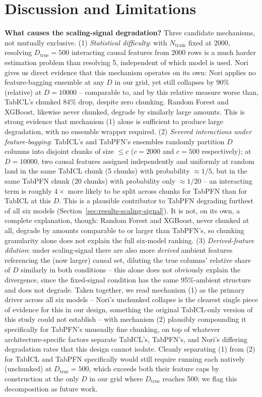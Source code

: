 \documentclass{article}
\begin{document}
\section{Discussion and Limitations}
\label{sec:discussion}

\textbf{What causes the scaling-signal degradation?} Three candidate mechanisms, not
mutually exclusive. (1) \emph{Statistical difficulty}: with $N_{\text{train}}$ fixed at
2000, resolving $D_{\text{true}}=500$ interacting causal features from 2000 rows is a
much harder estimation problem than resolving 5, independent of which model is used.
Nori gives us direct evidence that this mechanism operates on its own: Nori applies no
feature-bagging ensemble at any $D$ in our grid, yet still collapses by 90\% (relative)
at $D{=}10000$ -- comparable to, and by this relative measure worse than, TabICL's
chunked 84\% drop, despite zero chunking. Random Forest and XGBoost, likewise never
chunked, degrade by similarly large amounts. This is strong evidence that mechanism (1)
alone is sufficient to produce large degradation, with no ensemble wrapper required.
(2) \emph{Severed interactions under feature-bagging}: TabICL's and TabPFN's ensembles
randomly partition $D$ columns into disjoint chunks of size $\leq c$ ($c=2000$ and
$c=500$ respectively); at $D=10000$, two causal features assigned independently and
uniformly at random land in the same TabICL chunk (5 chunks) with probability
$\approx 1/5$, but in the same TabPFN chunk (20 chunks) with probability only
$\approx 1/20$ -- an interacting term is roughly $4\times$ more likely to be split
across chunks for TabPFN than for TabICL at this $D$. This is a plausible contributor
to TabPFN degrading furthest of all six models (Section~\ref{sec:results-scaling-signal}).
It is not, on its own, a complete explanation, though: Random Forest and XGBoost,
never chunked at all, degrade by amounts comparable to or larger than TabPFN's, so
chunking granularity alone does not explain the full six-model ranking. (3)
\emph{Derived-feature dilution}: under scaling-signal there are also more
\emph{derived} ambient features referencing the (now larger) causal set, diluting the
true columns' relative share of $D$ similarly in both conditions -- this alone does
not obviously explain the divergence, since the fixed-signal condition has the same
95\%-ambient structure and does not degrade. Taken together, we read mechanism (1) as
the primary driver across all six models -- Nori's unchunked collapse is the clearest
single piece of evidence for this in our design, something the original TabICL-only
version of this study could not establish -- with mechanism (2) plausibly compounding
it specifically for TabPFN's unusually fine chunking, on top of whatever
architecture-specific factors separate TabICL's, TabPFN's, and Nori's differing
degradation rates that this design cannot isolate. Cleanly separating (1) from (2) for
TabICL and TabPFN specifically would still require running each natively (unchunked)
at $D_{\text{true}}=500$, which exceeds both their feature caps by construction at the
only $D$ in our grid where $D_{\text{true}}$ reaches 500; we flag this decomposition
as future work.
\end{document}
